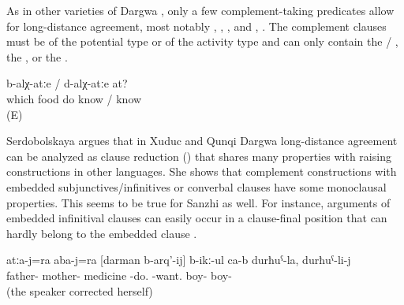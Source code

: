 As in other varieties of Dargwa \citep{Serdobolskaya2010}, only a few complement-taking predicates allow for long-distance agreement, most notably  ,  ,  , and  , . The complement clauses must be of the potential type or of the activity type and can only contain the \slash {} , the  , or the  . 
%
\begin{exe}
	\ex	\label{ex:‎Which food do you know to cook}
		b-alχ-atːe	/	d-alχ-atːe	at?\\
		which	food	do	know	/	know	\\
	\glt	{} (E)
\end{exe}

Serdobolskaya \citeyearpar{Serdobolskaya2009, Serdobolskaya2010} argues that in Xuduc and Qunqi Dargwa long-distance agreement can be analyzed as clause reduction () that shares many properties with raising constructions in other languages. She shows that complement constructions with embedded subjunctives/infinitives or converbal clauses have some monoclausal properties. This seems to be true for Sanzhi as well. For instance, arguments of embedded infinitival clauses can easily occur in a clause-final position that can hardly belong to the embedded clause .

\begin{exe}
	\ex	\label{ex:The father and the mother want to give medicine of the son, to the son.}
	\gll	atːa-j=ra	aba-j=ra	[darman	b-arq'-ij]	b-ikː-ul	ca-b	durħuˁ-la,		durħuˁ-li-j\\
		father-	mother-	medicine	\tsc{n}-do.	-want.		boy-	boy-\\
	\glt	{} (the speaker corrected herself)
\end{exe}

